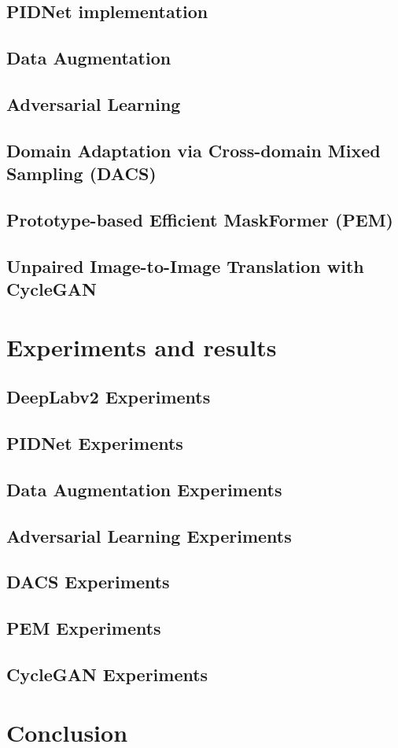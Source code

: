 \documentclass[10pt,twocolumn,letterpaper]{article}
\begin{document}
\subsection{PIDNet implementation}

\subsection{Data Augmentation}

\subsection{Adversarial Learning}

\subsection{Domain Adaptation via Cross-domain Mixed Sampling (DACS)}

\subsection{Prototype-based Efficient MaskFormer (PEM)}

\subsection{Unpaired Image-to-Image Translation with CycleGAN}

\section{Experiments and results}

\subsection{DeepLabv2 Experiments}

\subsection{PIDNet Experiments}

\subsection{Data Augmentation Experiments}

\subsection{Adversarial Learning Experiments}

\subsection{DACS Experiments}

\subsection{PEM Experiments}

\subsection{CycleGAN Experiments}

\section{Conclusion}



\end{document}
